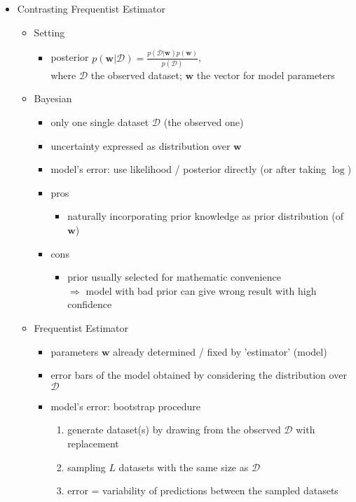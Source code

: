 \begin{itemize}
\item Contrasting Frequentist Estimator
	\begin{itemize}
	\item Setting
 		\begin{itemize}
 		\item posterior $\displaystyle p(\mathbf w|\mathcal D) = \frac {p(\mathcal D|\mathbf w)p(\mathbf w)}{p(\mathcal D)}$, \\
 		where $\mathcal D$ the observed dataset; $\mathbf w$ the vector for model parameters
 		\end{itemize}
	\item Bayesian
		\begin{itemize}
		\item only one single dataset $\mathcal D$ (the observed one)
 		\item uncertainty expressed as distribution over $\mathbf w$
 		\item model's error: use likelihood / posterior directly (or after taking $\log$)
 		\item pros
 			\begin{itemize}
 			\item naturally incorporating prior knowledge as prior distribution (of $\mathbf w$)
 			\end{itemize}
 		\item cons
 			\begin{itemize}
 			\item prior usually selected for mathematic convenience \\
 			$\Rightarrow$ model with bad prior can give wrong result with high confidence
 			\end{itemize}
 		\end{itemize}
 	\item Frequentist Estimator
 		\begin{itemize}
 		\item parameters $\mathbf w$ already determined / fixed by 'estimator' (model)
 		\item error bars of the model obtained by considering the distribution over $\mathcal D$
 		\item model's error: bootstrap procedure
 			\begin{enumerate}
 			\item generate dataset(s) by drawing from the observed $\mathcal D$ with replacement
 			\item sampling $L$ datasets with the same size as $\mathcal D$
 			\item error = variability of predictions between the sampled datasets

\end{enumerate}
\end{itemize}
\end{itemize}
\end{itemize}
